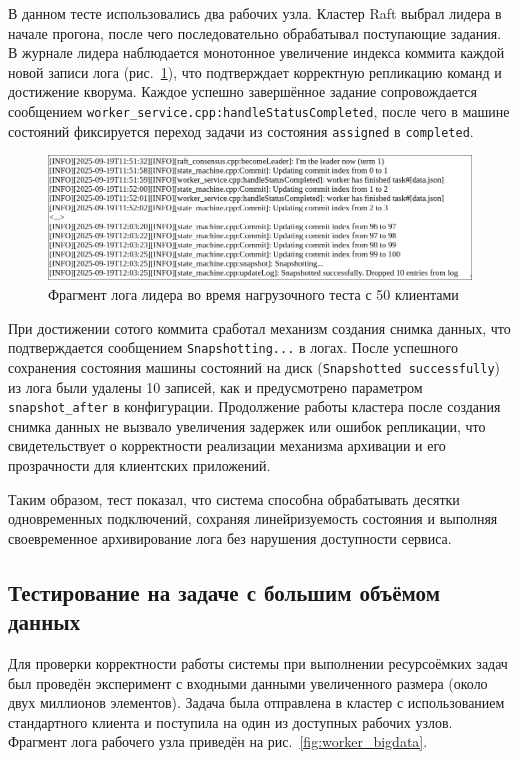 В данном тесте использовались два рабочих узла. Кластер Raft выбрал
лидера в начале прогона, после чего последовательно обрабатывал поступающие
задания. В журнале лидера наблюдается монотонное увеличение индекса коммита
каждой новой записи лога (рис.~\ref{fig:leader_log_50}), что подтверждает
корректную репликацию команд и достижение кворума. Каждое успешно завершённое
задание сопровождается сообщением
\texttt{worker\_service.cpp:handleStatusCompleted}, после чего в машине
состояний фиксируется переход задачи из состояния \texttt{assigned} в
\texttt{completed}.

\begin{figure}[h!]
    \centering
    \includegraphics[width=0.95\linewidth]{inc/leader-multi-conn.png}
    \caption{Фрагмент лога лидера во время нагрузочного теста с 50 клиентами}
    \label{fig:leader_log_50}
\end{figure}

При достижении сотого коммита сработал механизм создания снимка данных, что
подтверждается сообщением \texttt{Snapshotting...} в логах. После успешного
сохранения состояния машины состояний на диск (\texttt{Snapshotted
successfully}) из лога были удалены 10 записей, как и предусмотрено параметром
\texttt{snapshot\_after} в конфигурации. Продолжение работы кластера после
создания снимка данных не вызвало увеличения задержек или ошибок репликации, что
свидетельствует о корректности реализации механизма архивации и его
прозрачности для клиентских приложений.

Таким образом, тест показал, что система способна обрабатывать десятки
одновременных подключений, сохраняя линейризуемость состояния и выполняя
своевременное архивирование лога без нарушения доступности сервиса.

\subsection{Тестирование на задаче с большим объёмом данных}

Для проверки корректности работы системы при выполнении ресурсоёмких задач был
проведён эксперимент с входными данными увеличенного размера (около двух
миллионов элементов). Задача была отправлена в кластер с использованием
стандартного клиента и поступила на один из доступных рабочих узлов. Фрагмент
лога рабочего узла приведён на рис.~\ref{fig:worker_bigdata}.

